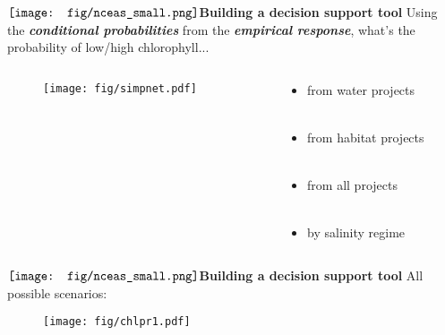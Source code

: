 \documentclass[serif]{beamer}\usepackage[]{graphicx}\usepackage[]{color}
\newcommand{\emtxt}[1]{\textbf{\textit{{\color{mypal4} #1}}}}
\begin{document}
\begin{frame}{{$\vcenter{\hbox{\texttt{[image: fig/nceas\_small.png]}}}$\hspace{0.07in}\textbf{Building a decision support tool}}}
Using the \emtxt{conditional probabilities} from the \emtxt{empirical response}, what's the probability of low/high chlorophyll... 
\begin{columns}
\begin{column}{0.55\textwidth}
\begin{figure}
\centering
\texttt{[image: fig/simpnet.pdf]}
\end{figure}
\end{column}
\begin{column}{0.45\textwidth}
\begin{itemize}
\item<2-> from water projects \\~\\
\item<3-> from habitat projects \\~\\ 
\item<4-> from all projects \\~\\
\item<5-> by salinity regime
\end{itemize}
\end{column}
\end{columns}
\end{frame}



\begin{frame}{{$\vcenter{\hbox{\texttt{[image: fig/nceas\_small.png]}}}$\hspace{0.07in}\textbf{Building a decision support tool}}}
All possible scenarios:
\begin{figure}
\centering
\texttt{[image: fig/chlpr1.pdf]}
\end{figure}
\end{frame}
\end{document}
